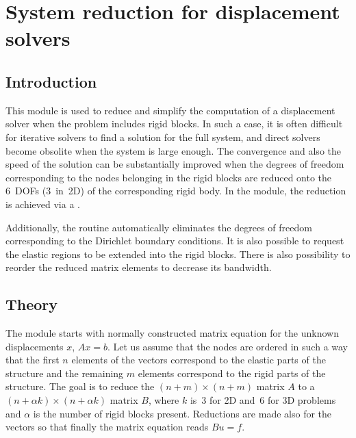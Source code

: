 \chapter{System reduction for displacement solvers}


\begin{versiona}


\section{Introduction}

 This module is used to reduce and simplify
the computation of a displacement solver when the problem includes
rigid blocks. In such a case, it is often difficult for iterative
solvers to find a solution for the full system, and direct solvers
become obsolite when the system is large enough. The convergence and
also the speed of the solution can be substantially improved when the
degrees of freedom corresponding to the nodes belonging in the rigid
blocks are reduced onto the 6~DOFs (3~in~2D) of the corresponding
rigid body. In the module, the reduction is achieved via a
.

Additionally, the routine automatically eliminates the degrees of
freedom corresponding to the Dirichlet boundary conditions. It is also
possible to request the elastic regions to be extended into the rigid
blocks. There is also possibility to reorder the reduced matrix
elements to decrease its bandwidth. 


\section{Theory}

The module starts with normally constructed matrix equation for the
unknown displacements $x$, $Ax=b$. Let us assume that the nodes are
ordered in such a way that the first $n$ elements of the vectors
correspond to the elastic parts of the structure and the remaining $m$
elements correspond to the rigid parts of the structure. The goal is
to reduce the $(n+m)\times (n+m)$ matrix $A$ to a $(n+\alpha k)\times
(n+\alpha k)$ matrix $B$, where $k$ is~3 for 2D and~6 for 3D problems
and $\alpha$ is the number of rigid blocks present. Reductions are
made also for the vectors so that finally the matrix equation reads
$Bu = f$.


\end{versiona}
